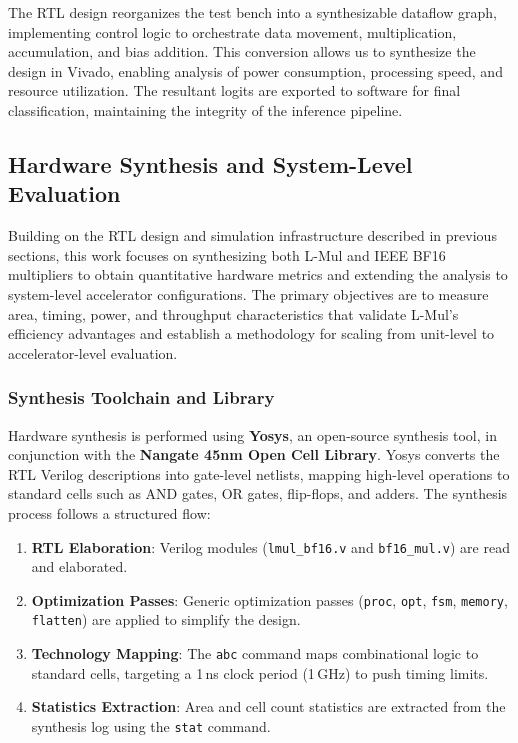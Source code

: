 \documentclass[12pt,letterpaper]{article}
\begin{document}
The RTL design reorganizes the test bench into a synthesizable dataflow graph, implementing control logic to orchestrate data movement, multiplication, accumulation, and bias addition. This conversion allows us to synthesize the design in Vivado, enabling analysis of power consumption, processing speed, and resource utilization. The resultant logits are exported to software for final classification, maintaining the integrity of the inference pipeline. 

\subsection{Hardware Synthesis and System-Level Evaluation}

Building on the RTL design and simulation infrastructure described in previous sections, this work focuses on synthesizing both L-Mul and IEEE BF16 multipliers to obtain quantitative hardware metrics and extending the analysis to system-level accelerator configurations. The primary objectives are to measure area, timing, power, and throughput characteristics that validate L-Mul's efficiency advantages and establish a methodology for scaling from unit-level to accelerator-level evaluation.

\subsubsection{Synthesis Toolchain and Library}
Hardware synthesis is performed using \textbf{Yosys}, an open-source synthesis tool, in conjunction with the \textbf{Nangate 45nm Open Cell Library}. Yosys converts the RTL Verilog descriptions into gate-level netlists, mapping high-level operations to standard cells such as AND gates, OR gates, flip-flops, and adders. The synthesis process follows a structured flow:
\begin{enumerate}
    \item \textbf{RTL Elaboration}: Verilog modules (\texttt{lmul\_bf16.v} and \texttt{bf16\_mul.v}) are read and elaborated.
    \item \textbf{Optimization Passes}: Generic optimization passes (\texttt{proc}, \texttt{opt}, \texttt{fsm}, \texttt{memory}, \texttt{flatten}) are applied to simplify the design.
    \item \textbf{Technology Mapping}: The \texttt{abc} command maps combinational logic to standard cells, targeting a 1\,ns clock period (1\,GHz) to push timing limits.
    \item \textbf{Statistics Extraction}: Area and cell count statistics are extracted from the synthesis log using the \texttt{stat} command.
\end{enumerate}
\end{document}
